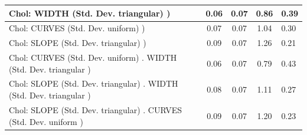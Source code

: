 \begin{table}
\begin{center}
\begin{tabular}{|l|l|c|c|c|l|}
			\hline
			 Chol: WIDTH (Std. Dev. triangular) ) &  & 0.06 & 0.07 & 0.86 & 0.39 \\
			\hline
			 Chol: CURVES (Std. Dev. uniform) ) &  & 0.07 & 0.07 & 1.04 & 0.30 \\
			\hline
			 Chol: SLOPE (Std. Dev. triangular) ) &  & 0.09 & 0.07 & 1.26 & 0.21 \\
			\hline
			 Chol: CURVES (Std. Dev. uniform) . WIDTH (Std. Dev.   triangular ) &  & 0.06 & 0.07 & 0.79 & 0.43 \\
			\hline
			 Chol: SLOPE (Std. Dev. triangular) . WIDTH (Std. Dev.   triangular ) &  & 0.08 & 0.07 & 1.11 & 0.27 \\
			\hline
			 Chol: SLOPE (Std. Dev. triangular) . CURVES (Std. Dev.   uniform ) &  & 0.09 & 0.07 & 1.20 & 0.23 \\
			\hline
		\end{tabular}
	\end{center}
\end{table}